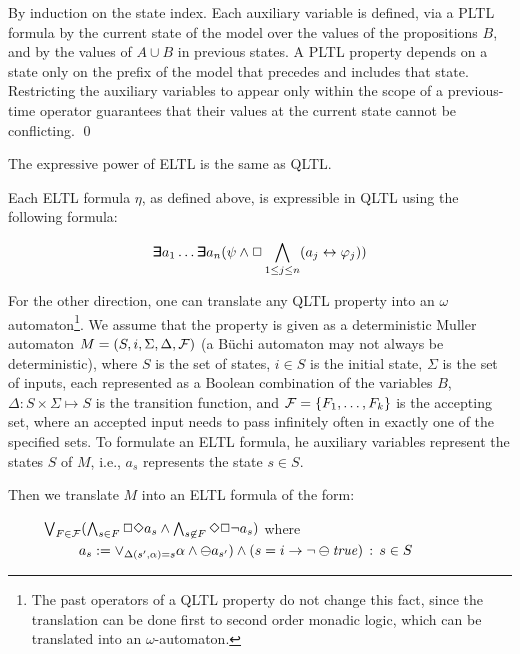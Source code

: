 By induction on the state index. Each auxiliary variable
is defined, via a PLTL formula by the current state of the model over the values of the propositions $B$, and by the values of $A \cup B$ in previous states. A PLTL
property depends on a state only on the prefix
of the model that precedes and includes that state.
Restricting the auxiliary variables to appear only within the scope of a previous-time operator guarantees that
their values at the current state cannot be conflicting. \qed


\begin{theorem}
\label{theo1}
The expressive power of 
ELTL is the same as QLTL.
\end{theorem}
Each ELTL formula $\eta$, as defined above,
is expressible in QLTL using the following formula:

\[   \bm{\exists}\kern-0.6em\bm{\exists} a_1 \ldots \bm{\exists}\kern-0.6em\bm{\exists} a_n  ( \psi  \wedge   \Box \bigwedge_{1 \leq j \leq n} ( a_j \leftrightarrow \varphi_j))
\]


For the other direction, one can translate any QLTL property into an $\omega$ automaton\footnote{The past operators of a QLTL property do not change this fact, since the translation can be done first to second order monadic logic, which can be translated into an $\omega$-automaton.}.
We assume that the property is given as a deterministic Muller automaton $M = (S, i , \Sigma, \Delta, {\cal F})$ (a B\"{u}chi automaton may not always be deterministic), where $S$ is the set of states, $i \in S$ is the initial state, $\Sigma$ is the set of inputs, each represented as a Boolean combination of the variables $B$, $\Delta : S \times \Sigma \mapsto S$ is the transition function, and ${\cal F} = \{ F_1 , \ldots , F_k \}$ is the accepting set, 
where an accepted input needs to pass infinitely often in exactly
one of the specified sets. To formulate an ELTL formula,
he auxiliary variables represent the states $S$ of $M$, i.e., $a_s$ represents the state $s \in S$.


\noindent
Then we translate $M$ into an ELTL formula
of the form: 

\begin{tabbing}
\ \ \ \ \ $\bigvee_{F \in {\cal F}} (\bigwedge_{s \in F} \Box\Diamond a_s \wedge \bigwedge_{s \not\in F} \Diamond \Box \neg a_s)$
where \\
\ \ \ \ \ \ \ \ \ \ $a_s := \vee _{\Delta ( s'
, \alpha ) = s } 
\alpha \wedge \ominus a_{s'} )
\wedge (s=i \rightarrow \neg \ominus \mathit{true})
\, :\,  s \in S
$
\end{tabbing}

